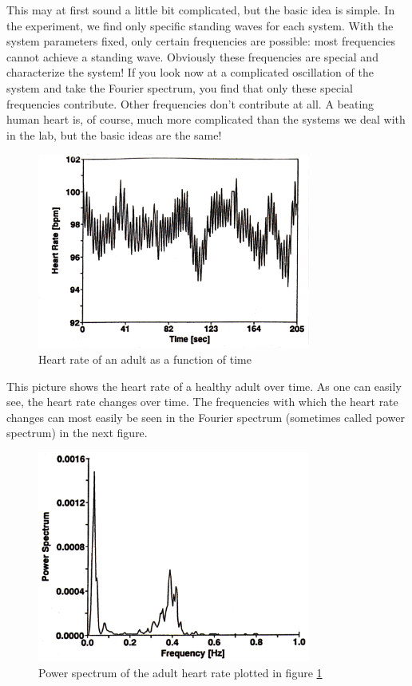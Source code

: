 This may at first sound a little bit complicated, but the basic idea is simple. In the experiment, we find only specific standing waves for each system. With the system parameters fixed, only certain frequencies are possible: most frequencies cannot achieve a standing wave. Obviously these frequencies are special and characterize the system! If you look now at a complicated oscillation of the system and take the Fourier spectrum, you find that only these special frequencies contribute. Other frequencies don't contribute at all. A beating human heart is, of course, much more complicated than the systems we deal with in the lab, but the basic ideas are the same!\myskip
\begin{figure}[h]
\centering
\includegraphics[width=0.8\textwidth]{./Exp8/pic/image6.png}
\caption{Heart rate of an adult as a function of time}
\label{fig:heart}
\end{figure} 

This picture shows the heart rate of a healthy adult over time. As one can easily see, the heart rate changes over time. The frequencies with which the heart rate changes can most easily be seen in the Fourier spectrum (sometimes called power spectrum) in the next figure.\myskip
\begin{figure}[h]
\centering
\includegraphics[width=0.8\textwidth]{./Exp8/pic/image7.png}
\caption{Power spectrum of the adult heart rate plotted in figure \ref{fig:heart}}
\end{figure} 

